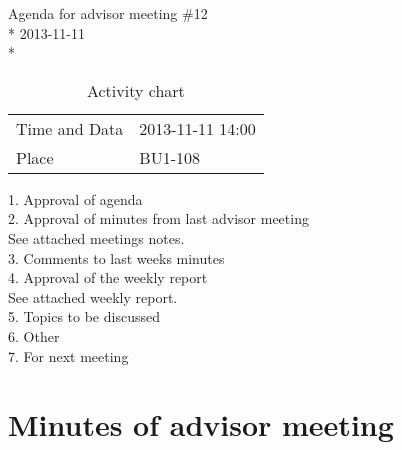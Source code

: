 \begin{center}
Agenda for advisor meeting \#12\\*
2013-11-11\\*
\end{center}

\begin{table}[H]
\begin{center}
\begin{tabular}{ l | l }
Time and Data & 2013-11-11 14:00 \\
Place & BU1-108 \\
\end{tabular}
\end{center}
\caption{Activity chart}
\label{table:activityChartAdvisorAgendaWeek46}
\end{table}


1. Approval of agenda \\
2. Approval of minutes from last advisor meeting \\
See attached meetings notes. \\
3. Comments to last weeks minutes \\
4. Approval of the weekly report \\
See attached weekly report. \\
5. Topics to be discussed \\
6. Other \\
7. For next meeting \\


\section{Minutes of advisor meeting}
